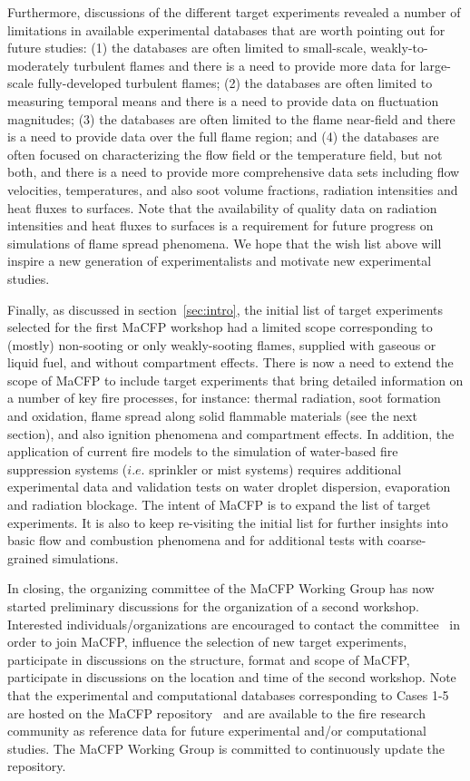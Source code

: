 Furthermore, discussions of the different target experiments revealed a number of limitations in available experimental databases that are worth pointing out for future studies: (1) the databases are often limited to small-scale, weakly-to-moderately turbulent flames and there is a need to provide more data for large-scale fully-developed turbulent flames; (2) the databases are often limited to measuring temporal means and there is a need to provide data on fluctuation magnitudes; (3) the databases are often limited to the flame near-field and there is a need to provide data over the full flame region; and (4) the databases are often focused on characterizing the flow field or the temperature field, but not both, and there is a need to provide more comprehensive data sets including flow velocities, temperatures, and also soot volume fractions, radiation intensities and heat fluxes to surfaces. Note that the availability of quality data on radiation intensities and heat fluxes to surfaces is a requirement for future progress on simulations of flame spread phenomena. We hope that the wish list above will inspire a new generation of experimentalists and motivate new experimental studies.

Finally, as discussed in section~\ref{sec:intro}, the initial list of target experiments selected for the first MaCFP workshop had a limited scope corresponding to (mostly) non-sooting or only weakly-sooting flames, supplied with gaseous or liquid fuel, and without compartment effects. There is now a need to extend the scope of MaCFP to include target experiments that bring detailed information on a number of key fire processes, for instance: thermal radiation, soot formation and oxidation, flame spread along solid flammable materials (see the next section), and also ignition phenomena and compartment effects. In addition, the application of current fire models to the simulation of water-based fire suppression systems ($i.e.$ sprinkler or mist systems) requires additional experimental data and validation tests on water droplet dispersion, evaporation and radiation blockage. The intent of MaCFP is to expand the list of target experiments. It is also to keep re-visiting the initial list for further insights into basic flow and combustion phenomena and for additional tests with coarse-grained simulations. 

In closing, the organizing committee of the MaCFP Working Group has now started preliminary discussions for the organization of a second workshop. Interested individuals/organizations are encouraged to contact the committee~\cite{MaCFP_website} in order to join MaCFP, influence the selection of new target experiments, participate in discussions on the structure, format and scope of MaCFP, participate in discussions on the location and time of the second workshop. Note that the experimental and computational databases corresponding to Cases 1-5 are hosted on the MaCFP repository~\cite{MaCFP_repository} and are available to the fire research community as reference data for future experimental and/or computational studies. The MaCFP Working Group is committed to continuously update the repository.
